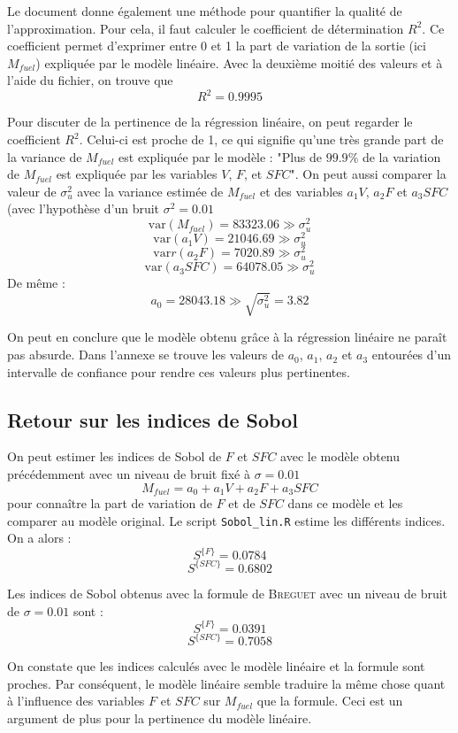 \documentclass{article}
\begin{document}
Le document \cite{ref1} donne également une méthode pour quantifier la qualité de l'approximation. Pour cela, il faut calculer le coefficient de détermination $R^{2}$. Ce coefficient permet d'exprimer entre 0 et 1 la part de variation de la sortie (ici $M_{fuel}$) expliquée par le modèle linéaire. Avec la deuxième moitié des valeurs et à l'aide du fichier, on trouve que 
\[R^{2}=0.9995\]


Pour discuter de la pertinence de la régression linéaire, on peut regarder le coefficient $R^{2}$. Celui-ci est proche de 1, ce qui signifie qu'une très grande part de la variance de $M_{fuel}$ est expliquée par le modèle : "Plus de $99.9\%$ de la variation de $M_{fuel}$ est expliquée par les variables $V$, $F$, et $SFC$". On peut aussi comparer la valeur de $\sigma^{2}_{u}$ avec la variance estimée de $M_{fuel}$ et des variables $a_1V$, $a_2F$ et $a_3SFC$ (avec l'hypothèse d'un bruit $\sigma^{2}=0.01$ 
\[\text{var}(M_{fuel})=83323.06 \gg  \sigma^{2}_{u}\]
\[\text{var}(a_1V)=21046.69 \gg  \sigma^{2}_{u}\]
\[\text{var}r(a_2F)=7020.89 \gg  \sigma^{2}_{u}\]
\[\text{var}(a_3SFC)=64078.05 \gg  \sigma^{2}_{u}\]
De même :
\[a_{0}=28043.18 \gg \sqrt{\sigma^{2}_{u}}=3.82\]

On peut en conclure que le modèle obtenu grâce à la régression linéaire ne paraît pas absurde. Dans l'annexe se trouve les valeurs de $a_0$, $a_1$, $a_2$ et $a_3$ entourées d'un intervalle de confiance pour rendre ces valeurs plus pertinentes. 
\subsection{Retour sur les indices de Sobol}
On peut estimer les indices de Sobol de $F$ et $SFC$ avec le modèle obtenu précédemment avec un niveau de bruit fixé à  $\sigma=0.01$
\[M_{fuel}=a_{0}+a_{1}V+a_{2}F+a_{3}SFC\]
pour connaître la part de variation de $F$ et de $SFC$ dans ce modèle et les comparer au modèle original.
Le script \texttt{Sobol\_lin.R} estime les différents indices. On a alors :
\[S^{\{F\}}=0.0784\]
\[S^{\{SFC\}}=0.6802\]

Les indices de Sobol obtenus avec la formule de \textsc{Breguet} avec un niveau de bruit de $\sigma=0.01$ sont :
\[S^{\{F\}}=0.0391\]
\[S^{\{SFC\}}=0.7058\]

On constate que les indices calculés avec le modèle linéaire et la formule sont proches. Par conséquent, le modèle linéaire semble traduire la même chose quant à l'influence des variables $F$ et $SFC$ sur $M_{fuel}$ que la formule. Ceci est un argument de plus pour la pertinence du modèle linéaire. 
\end{document}
